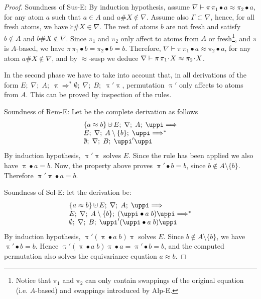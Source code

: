 \documentclass{llncs}
\newcommand{\Lra}{\Longrightarrow}
\newcommand{\perm}{\approx}
\newcommand{\permap}{{\mkern 1mu\cdot \mkern 1mu}}
\newcommand{\permef}{\bullet}
\newcommand\ppi{\uppi}
\newcommand{\dotcup}{\ensuremath{\mathop{\mathaccent\cdot\cup}}}
\newcommand{\mran}{A}
\newcommand{\mproblem}{E}
\newcommand{\mnabla}{\nabla}
\newcommand{\fresh}[1]{{\acute{#1}}}
\newcommand{\Atoms}{A}
\begin{document}
\begin{proof}
Soundness of {\sf Sus-E}:  By induction hypothesis, assume
$\nabla\vdash\pi\,\pi_1\permef a \approx \pi_2\permef a$, for any atom
$a$ such that $a\in\Atoms$ and $a\#X\not\in\nabla$.  Assume also
$\Gamma\subset\nabla$, hence, for all fresh atoms, we have
$\fresh{c}\#X\in\nabla$. The rest of atoms $b$ are not fresh and
satisfy $b\not\in\Atoms$ and $b\#X\not\in\nabla$. Since $\pi_1$ and
$\pi_2$ only affect to atoms from $A$ or fresh\footnote{Notice that
  $\pi_1$ and $\pi_2$ can only contain swappings of the original
  equation (i.e. $\Atoms$-based) and swappings introduced by {\sf
    Alp-E}.}, and $\pi$ is $\Atoms$-based, we have $\pi\,\pi_1\permef
b = \pi_2\permef b = b$.  Therefore, $\nabla\vdash\pi\,\pi_1\permef a
\approx \pi_2\permef a$, for any atom $a\#X\not\in\nabla$, and by
$\approx$-susp we deduce $\nabla\vdash \pi\,\pi_1\permap X \approx
\pi_2\permap X$.

In the second phase we have to take into account that, in all
derivations of the form $\mproblem ;\; \mnabla ;\; A ;\; \ppi \Lra^*
\emptyset;\; \mnabla ;\; B ;\;\ppi'\ppi$, permutation $\ppi'$ only
affects to atoms from $A$. This can be proved by inspection of the
rules.

Soundness of {\sf Rem-E}: Let be the complete derivation as follows
$$
\begin{array}{l}
\{a \perm b\} \dotcup \mproblem ;\; \mnabla ;\; \mran ;\;\ppi \Lra\\
\mproblem ;\; \mnabla ;\; \mran\setminus\{b\} ;\; \ppi \Lra^*\\
\emptyset;\; \mnabla ;\; B ;\;\ppi'\ppi
\end{array}
$$ 
By induction hypothesis, $\ppi'\ppi$ solves $\mproblem$.  Since the
rule has been applied we also have $\ppi\permef a = b$.  Now, the
property above proves $\ppi'\permef b = b$, since
$b\not\in\mran\setminus\{b\}$. Therefore $\ppi'\ppi\permef a = b$.

Soundness of {\sf Sol-E}: let the derivation be:
$$
\begin{array}{l}
\{a \perm b\} \dotcup \mproblem ;\; \mnabla ;\; \mran ;\;\ppi \Lra\\
\mproblem ;\; \mnabla ;\; \mran\setminus\{b\} ;\; (\ppi\permef a\; b)\ppi \Lra^*\\
\emptyset;\; \mnabla ;\; B ;\;\ppi'(\ppi\permef a\; b)\ppi
\end{array}
$$ By induction hypothesis, $\ppi'(\ppi\permef a\; b)\ppi$ solves
$\mproblem$. Since $b\not\in\mran\setminus\{b\}$, we have $\ppi'\permef b
= b$. Hence $\ppi'(\ppi\permef a\; b)\ppi \permef a = \ppi'\permef b =
b$, and the computed permutation also solves the equivariance equation
$a \perm b$.
\end{proof}
\end{document}
